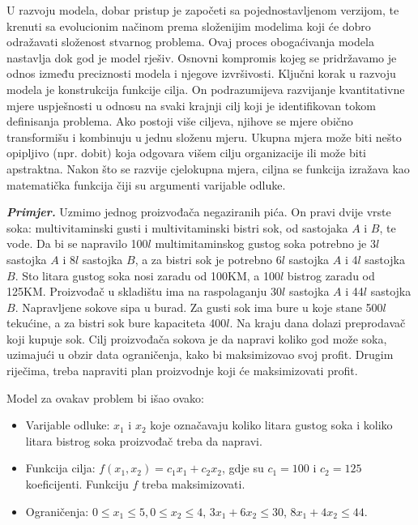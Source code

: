 \documentclass[a4paper, utf8, 11pt, colorlinks]{book}
\begin{document}
 U razvoju modela, dobar pristup je započeti sa pojednostavljenom verzijom, te   krenuti sa evolucionim načinom prema složenijim modelima koji će dobro odražavati složenost stvarnog problema. Ovaj proces obogaćivanja modela nastavlja dok god je model rješiv. Osnovni kompromis kojeg se pridržavamo je odnos između preciznosti modela i njegove izvršivosti. Ključni korak u razvoju modela je konstrukcija funkcije cilja.
On podrazumijeva razvijanje kvantitativne mjere uspješnosti u odnosu na svaki   krajnji cilj koji je identifikovan tokom definisanja problema.
Ako postoji više ciljeva, njihove se mjere obično transformišu
i kombinuju u jednu složenu mjeru.  Ukupna mjera može biti nešto opipljivo (npr. dobit) koja odgovara višem cilju
organizacije ili može biti apstraktna.  Nakon što se razvije cjelokupna mjera,  ciljna se funkcija izražava kao matematička funkcija čiji su argumenti varijable odluke. 

\textbf{\emph{Primjer.}}  Uzmimo jednog proizvođa\v ca negaziranih pi\'ca. On pravi dvije vrste soka: multivitaminski gusti i multivitaminski bistri sok, od sastojaka $A$ i $B$, te vode. Da bi se napravilo 100$l$ multimitaminskog gustog soka potrebno je 3$l$
sastojka $A$ i 8$l$ sastojka $B$, a za bistri sok je potrebno 6$l$ sastojka $A$ i 4$l$ sastojka $B$. Sto litara gustog soka nosi zaradu od 100KM, a 100$l$ bistrog zaradu od 125KM. Proizvođa\v c u skladi\v stu
ima na raspolaganju 30$l$ sastojka $A$ i 44$l$ sastojka $B.$ Napravljene sokove sipa u burad. Za
gusti sok ima bure u koje stane 500$l$ teku\' cine, a za bistri sok bure kapaciteta 400$l$. Na kraju dana dolazi preprodava\v c koji kupuje sok. Cilj proizvođa\v ca sokova je da napravi koliko god
mo\v ze soka, uzimaju\' ci u obzir data ograni\v cenja, kako bi maksimizovao svoj profit. Drugim
rije\v cima, treba napraviti plan proizvodnje koji \' ce maksimizovati profit.

Model za ovakav problem bi išao ovako:
\begin{itemize}
    \item 
Varijable odluke: $x_1$ i $x_2$ koje označavaju koliko litara gustog soka i koliko litara bistrog soka proizvođač treba da napravi.  
\item Funkcija cilja: $f(x_1, x_2) = c_1x_1 + c_2 x_2$, gdje su $c_1 = 100$ i  $c_2 = 125$ koeficijenti. Funkciju $f$ treba maksimizovati. \\
\item Ograničenja: $0 \leq x_1 \leq 5, 0 \leq x_2 \leq 4$,   $3 x_1 + 6 x_2 \leq 30$, $8 x_1 + 4 x_2 \leq 44.$
\end{itemize}
\end{document}
